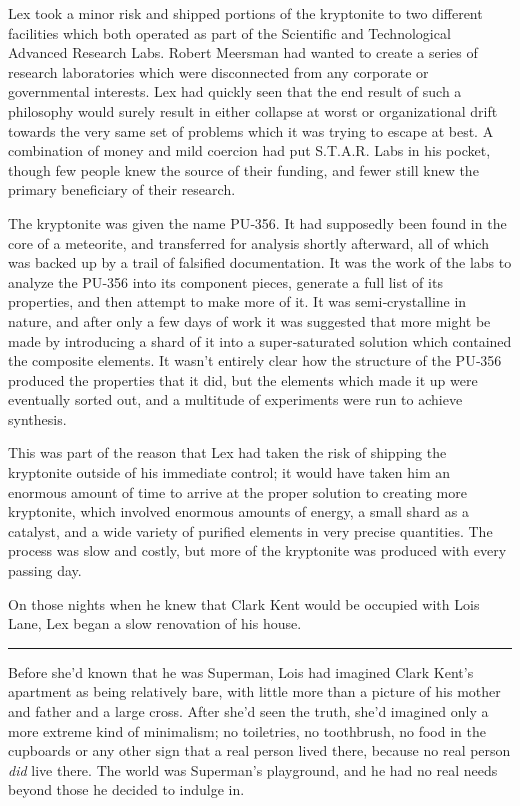 \documentclass[ebook,12pt]{memoir}
\begin{document}
Lex took a minor risk and shipped portions of the kryptonite to two
different facilities which both operated as part of the Scientific and
Technological Advanced Research Labs. Robert Meersman had wanted to
create a series of research laboratories which were disconnected from
any corporate or governmental interests. Lex had quickly seen that the
end result of such a philosophy would surely result in either collapse
at worst or organizational drift towards the very same set of problems
which it was trying to escape at best. A combination of money and mild
coercion had put S.T.A.R. Labs in his pocket, though few people knew the
source of their funding, and fewer still knew the primary beneficiary of
their research.

The kryptonite was given the name PU‐356. It had supposedly been found
in the core of a meteorite, and transferred for analysis shortly
afterward, all of which was backed up by a trail of falsified
documentation. It was the work of the labs to analyze the PU‐356 into
its component pieces, generate a full list of its properties, and then
attempt to make more of it. It was semi‐crystalline in nature, and after
only a few days of work it was suggested that more might be made by
introducing a shard of it into a super‐saturated solution which
contained the composite elements. It wasn't entirely clear how the
structure of the PU‐356 produced the properties that it did, but the
elements which made it up were eventually sorted out, and a multitude of
experiments were run to achieve synthesis.

This was part of the reason that Lex had taken the risk of shipping the
kryptonite outside of his immediate control; it would have taken him an
enormous amount of time to arrive at the proper solution to creating
more kryptonite, which involved enormous amounts of energy, a small
shard as a catalyst, and a wide variety of purified elements in very
precise quantities. The process was slow and costly, but more of the
kryptonite was produced with every passing day.

On those nights when he knew that Clark Kent would be occupied with Lois
Lane, Lex began a slow renovation of his house.

\begin{center}\rule{0.5\linewidth}{0.5pt}\end{center}

Before she'd known that he was Superman, Lois had imagined Clark Kent's
apartment as being relatively bare, with little more than a picture of
his mother and father and a large cross. After she'd seen the truth,
she'd imagined only a more extreme kind of minimalism; no toiletries, no
toothbrush, no food in the cupboards or any other sign that a real
person lived there, because no real person \emph{did} live there. The
world was Superman's playground, and he had no real needs beyond those
he decided to indulge in.
\end{document}
